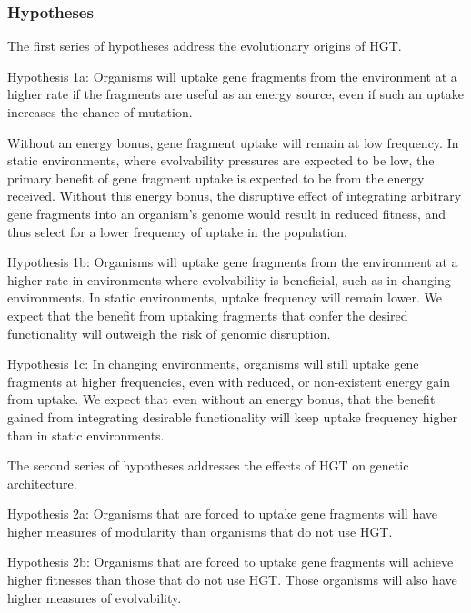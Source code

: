 \subsubsection{Hypotheses}

The first series of hypotheses address the evolutionary origins of HGT.

Hypothesis 1a: Organisms will uptake gene fragments from the environment at a higher rate if the fragments are useful as an energy source, even if such an uptake increases the chance of mutation. 

Without an energy bonus, gene fragment uptake will remain at low frequency. In static environments, where evolvability pressures are expected to be low, the primary benefit of gene fragment uptake is expected to be from the energy received. Without this energy bonus, the disruptive effect of integrating arbitrary gene fragments into an organism’s genome would result in reduced fitness, and thus select for a lower frequency of uptake in the population.

Hypothesis 1b: Organisms will uptake gene fragments from the environment at a higher rate in environments where evolvability is beneficial, such as in changing environments. In static environments, uptake frequency will remain lower. We expect that the benefit from uptaking fragments that confer the desired functionality will outweigh the risk of genomic disruption.

Hypothesis 1c: In changing environments, organisms will still uptake gene fragments at higher frequencies, even with reduced, or non-existent energy gain from uptake. We expect that even without an energy bonus, that the benefit gained from integrating desirable functionality will keep uptake frequency higher than in static environments.

The second series of hypotheses addresses the effects of HGT on genetic architecture.

Hypothesis 2a: Organisms that are forced to uptake gene fragments will have higher measures of modularity than organisms that do not use HGT.

Hypothesis 2b: Organisms that are forced to uptake gene fragments will achieve higher fitnesses than those that do not use HGT. Those organisms will also have higher measures of evolvability.